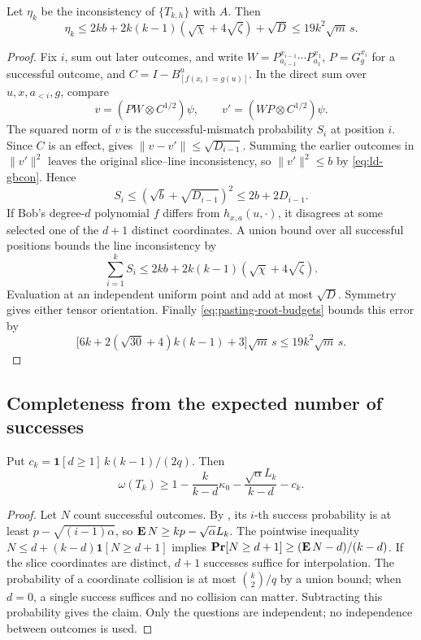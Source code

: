\documentclass[11pt]{article}
\theoremstyle{definition}
\renewcommand{\Pr}{\mathop{\bf Pr\/}}
\newcommand{\E}{\mathop{\bf E\/}}
\newcommand{\bone}{\boldsymbol{1}}
\begin{document}
\begin{lemma}[Consistency]\label{lem:pasting-consistency}
Let $\eta_k$ be the inconsistency of $\{T_{k,h}\}$ with $A$.
Then
\begin{equation}\label{eq:pasting-consistency-budget}
 \eta_k\leq2kb+2k(k-1)(\sqrt\chi+4\sqrt\zeta)+\sqrt D
       \leq19k^2\sqrt m\,s.
\end{equation}
\end{lemma}
\begin{proof}
Fix $i$, sum out later outcomes, and write
$W=P_{a_{i-1}}^{x_{i-1}}\cdots P_{a_1}^{x_1}$,
$P=G_g^{x_i}$ for a successful outcome, and
$C=I-B^u_{[f(x_i)=g(u)]}$.  In the direct sum over $u,x,a_{<i},g$,
compare
\[
 v=(PW\otimes C^{1/2})\psi,\qquad
 v'=(WP\otimes C^{1/2})\psi.
\]
The squared norm of $v$ is the successful-mismatch probability
$S_i$ at position $i$.  Since $C$ is an effect,
 gives
$\|v-v'\|\leq\sqrt{D_{i-1}}$.
Summing the earlier outcomes in $\|v'\|^2$ leaves the original
slice--line inconsistency, so $\|v'\|^2\leq b$ by
\eqref{eq:ld-gbcon}.  Hence
\[
 S_i\leq(\sqrt b+\sqrt{D_{i-1}})^2\leq2b+2D_{i-1}.
\]
If Bob's degree-$d$ polynomial $f$ differs from
$h_{x,a}(u,\cdot)$, it disagrees at some selected one of the $d+1$
distinct coordinates.  A union bound over all successful positions
bounds the line inconsistency by
\[
 \sum_{i=1}^kS_i
 \leq2kb+2k(k-1)(\sqrt\chi+4\sqrt\zeta).
\]
Evaluation at an independent uniform point and
 add at most $\sqrt D$.
Symmetry gives either tensor orientation.
Finally \eqref{eq:pasting-root-budgets} bounds this error by
\[
 \bigl[6k+2(\sqrt{30}+4)k(k-1)+3\bigr]
       \sqrt m\,s
 \leq19k^2\sqrt m\,s.
\]
\end{proof}

\subsection{Completeness from the expected number of successes}

\begin{lemma}[Completeness]\label{lem:first-success-completeness}
Put $c_k=\bone[d\geq1]\,k(k-1)/(2q)$.  Then
\begin{equation}\label{eq:first-success-completeness}
 \omega(T_k)\geq
 1-\frac{k}{k-d}\kappa_0
   -\frac{\sqrt\alpha L_k}{k-d}-c_k.
\end{equation}
\end{lemma}
\begin{proof}
Let $N$ count successful outcomes.  By
, its $i$-th success probability is
at least $p-\sqrt{(i-1)\alpha}$, so
$\E N\geq kp-\sqrt\alpha L_k$.
The pointwise inequality
$N\leq d+(k-d)\bone[N\geq d+1]$ implies
$\Pr[N\geq d+1]\geq(\E N-d)/(k-d)$.
If the slice coordinates are distinct, $d+1$ successes suffice for
interpolation.  The probability of a coordinate collision is at
most $\binom{k}{2}/q$ by a union bound; when $d=0$, a single success
suffices and no collision can matter.  Subtracting this probability
gives the claim.  Only the questions are independent; no independence
between outcomes is used.
\end{proof}
\end{document}
